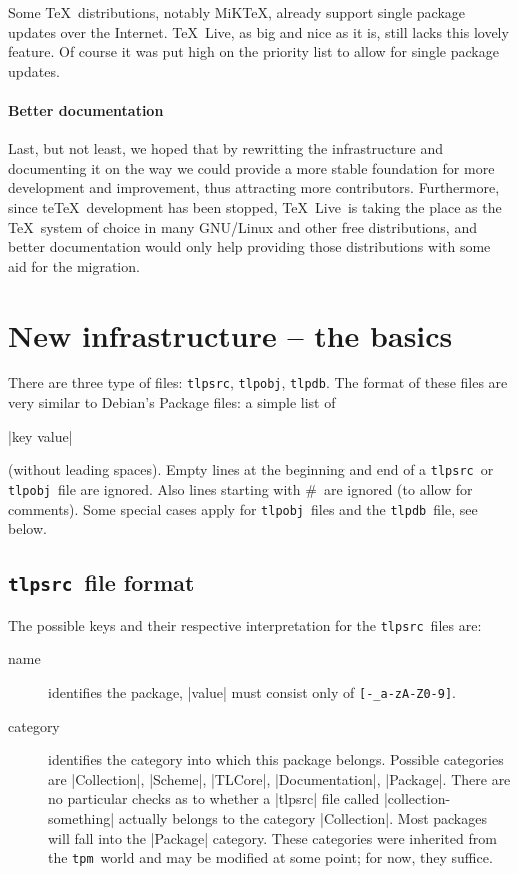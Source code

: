 \documentclass{arstexnica}
\newcommand{\tl}{\TeX~Live}
\newcommand{\tpm}{\texttt{tpm}}
\newcommand{\tlpsrc}{\texttt{tlpsrc}}
\newcommand{\tlpobj}{\texttt{tlpobj}}
\newcommand{\tlpdb}{\texttt{tlpdb}}
\begin{document}
\begin{article}
Some \TeX\ distributions, notably MiKTeX, already support single package
updates over the Internet.
\tl, as big and nice as it is, still lacks this lovely feature. Of course
it was put high on the priority list to allow for single package
updates. 

\paragraph{Better documentation}

Last, but not least, we hoped that by rewritting the infrastructure
and documenting it on the way we could provide a more stable foundation
for more development and improvement, thus attracting more
contributors. Furthermore, since te\TeX\ development has been stopped,
\tl\ is taking the place as the \TeX\ system of choice in many
GNU/Linux and other free distributions, and better documentation would
only help providing those distributions with some aid for the migration. 

\section{New infrastructure -- the basics}
\label{sec:basics}

There are three type of files: \tlpsrc, \tlpobj, \tlpdb. The
format of these files are very similar to Debian's Package files: a
simple list of 
\begin{center}
  |key    value|
\end{center}
(without leading spaces). Empty lines at the beginning and end of a
\tlpsrc\ or \tlpobj\ file are ignored. Also lines starting with \#\ are
ignored (to allow for comments). Some special cases apply for \tlpobj\
files and the \tlpdb\ file, see below.

\subsection{\tlpsrc\ file format}
\label{sec:tlpsrc}

The possible keys and their respective interpretation for the \tlpsrc\
files are: 
\begin{description}
\item[name] identifies the package, |value| must consist only of
  \verb+[-_a-zA-Z0-9]+.

\item[category]
  identifies the category into which this package belongs. Possible
  categories are |Collection|, |Scheme|, |TLCore|, |Documentation|,
  |Package|. There are no particular checks as to whether a
  |tlpsrc| file called |collection-something| actually belongs to the
  category |Collection|. Most packages will fall into the |Package|
  category.  These categories were inherited from the \tpm\ world and
  may be modified at some point; for now, they suffice.


\end{description}
\end{article}
\end{document}
